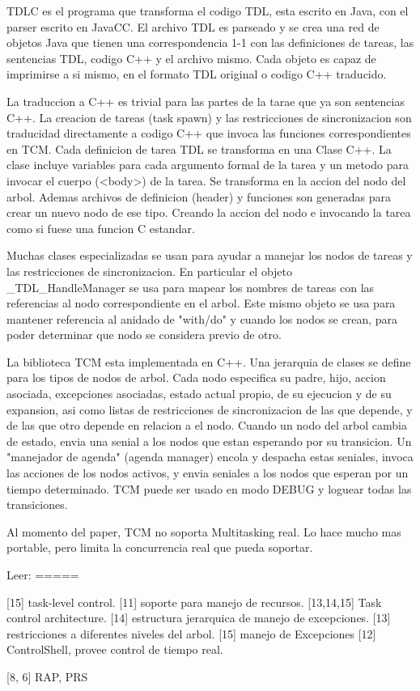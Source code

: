 \documentclass{article}
\begin{document}
TDLC es el programa que transforma el codigo TDL, esta escrito en Java, con
el parser escrito en JavaCC.
El archivo TDL es parseado y se crea una red de objetos Java que tienen
una correspondencia 1-1 con las definiciones de tareas, las sentencias
TDL, codigo C++ y el archivo mismo.
Cada objeto es capaz de imprimirse a si mismo, en el formato TDL original
o codigo C++ traducido.

La traduccion a C++ es trivial para las partes de la tarae que ya son
sentencias C++.
La creacion de tareas (task spawn) y las restricciones de sincronizacion
son traducidad directamente a codigo C++ que invoca las funciones 
correspondientes en TCM.
Cada definicion de tarea TDL se transforma en una Clase C++.
La clase incluye variables para cada argumento formal de la tarea y
un metodo para invocar el cuerpo (<body>) de la tarea. Se transforma
en la accion del nodo del arbol.
Ademas archivos de definicion (header) y funciones son generadas para
crear un nuevo nodo de ese tipo. Creando la accion del nodo e invocando
la tarea como si fuese una funcion C estandar.

Muchas clases especializadas se usan para ayudar a manejar los nodos
de tareas y las restricciones de sincronizacion. En particular
el objeto _TDL_HandleManager se usa para mapear los nombres de tareas con
las referencias al nodo correspondiente en el arbol.
Este mismo objeto se usa para mantener referencia al anidado de "with/do" y
cuando los nodos se crean, para poder determinar que nodo se
considera previo de otro.

La biblioteca TCM esta implementada en C++. Una jerarquia de clases se
define para los tipos de nodos de arbol.
Cada nodo especifica su padre, hijo, accion asociada, excepciones asociadas,
estado actual propio, de su ejecucion y de su expansion, asi como listas de
restricciones de sincronizacion de las que depende, y de las que otro 
depende en relacion a el nodo.
Cuando un nodo del arbol cambia de estado, envia una senial a los nodos
que estan esperando por su transicion.
Un "manejador de agenda" (agenda manager) encola y despacha estas seniales,
invoca las acciones de los nodos activos, y envia seniales a los nodos
que esperan por un tiempo determinado.
TCM puede ser usado en modo DEBUG y loguear todas las transiciones.

Al momento del paper, TCM no soporta Multitasking real. 
Lo hace mucho mas portable, pero limita la concurrencia real que pueda
soportar.


Leer:
=====

[15] task-level control.
[11] soporte para manejo de recursos.
[13,14,15] Task control architecture.
[14] estructura jerarquica de manejo de excepciones.
[13] restricciones a diferentes niveles del arbol.
[15] manejo de Excepciones
[12] ControlShell, provee control de tiempo real.


[8, 6] RAP, PRS
\end{document}
